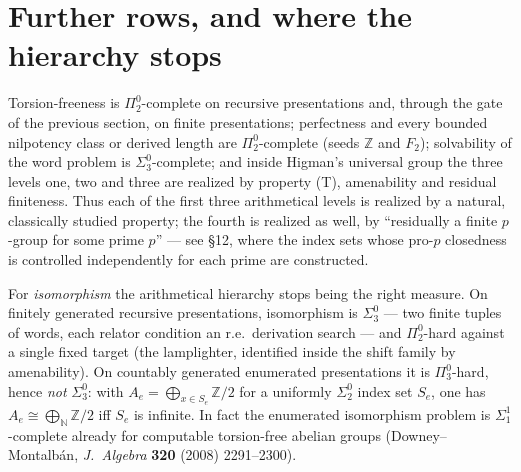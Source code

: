 \documentclass[11pt]{article}
\theoremstyle{definition}
\newcommand{\N}{\mathbb N}\newcommand{\Z}{\mathbb Z}\newcommand{\R}{\mathbb R}
\newcommand{\Pizt}{\Pi^0_2}\newcommand{\Sizt}{\Sigma^0_2}\newcommand{\Pith}{\Pi^0_3}\newcommand{\Sith}{\Sigma^0_3}
\begin{document}
\section{Further rows, and where the hierarchy stops}
Torsion-freeness is $\Pizt$-complete on recursive presentations and, through the gate of the previous section, on finite presentations; perfectness and every bounded nilpotency class or derived length are $\Pizt$-complete (seeds $\Z$ and $F_2$); solvability of the word problem is $\Sith$-complete; and inside Higman's universal group the three levels one, two and three are realized by property (T), amenability and residual finiteness. Thus each of the first three arithmetical levels is realized by a natural, classically studied property; the fourth is realized as well, by ``residually a finite $p$-group for some prime $p$'' --- see \S12, where the index sets whose pro-$p$ closedness is controlled independently for each prime are constructed.

For \emph{isomorphism} the arithmetical hierarchy stops being the right measure. On finitely generated recursive presentations, isomorphism is $\Sith$ --- two finite tuples of words, each relator condition an r.e.\ derivation search --- and $\Pizt$-hard against a single fixed target (the lamplighter, identified inside the shift family by amenability). On countably generated enumerated presentations it is $\Pith$-hard, hence \emph{not} $\Sith$: with $A_e=\bigoplus_{x\in S_e}\Z/2$ for a uniformly $\Sizt$ index set $S_e$, one has $A_e\cong\bigoplus_\N\Z/2$ iff $S_e$ is infinite. In fact the enumerated isomorphism problem is $\Sigma^1_1$-complete already for computable torsion-free abelian groups (Downey--Montalb\'an, \emph{J.\ Algebra} \textbf{320} (2008) 2291--2300).
\end{document}
